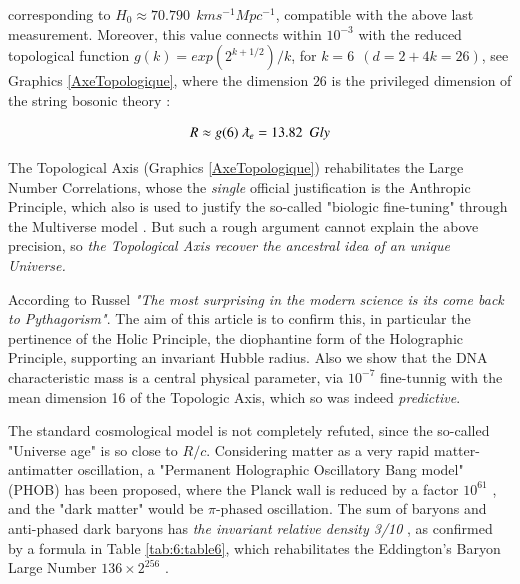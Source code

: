 \documentclass[a4paper,9pt]{article}
\begin{document}
corresponding to  $ H_0 \approx 70.790 ~~ km s^{-1} Mpc^{-1}$, compatible with the above last measurement. Moreover, this value connects within $10^{-3}$ with the reduced topological function $g(k) = exp(2^{k+1/2})/k$, for $k = 6 ~~(d = 2 +4k = 26)$, see Graphics \ref{AxeTopologique},  where the dimension $26$ is the privileged dimension of the string bosonic theory \cite{Sanchez3}:  


\begin{equation}\label{Eq2}
R \approx g(6)~\lambdabar_e  = 13.82~~Gly
 \end{equation}


The Topological Axis (Graphics \ref{AxeTopologique}) rehabilitates the Large Number Correlations, whose the \textit{single} official justification is the Anthropic Principle,  which also is used to justify the so-called "biologic fine-tuning" through the Multiverse model \cite {Rees}. But such a rough argument cannot explain the above precision, so \textit{the Topological Axis recover the ancestral idea of an unique Universe.} 


According to Russel \textit{"The most surprising in the modern science is its come back to Pythagorism"}\cite{Alcina}. The aim of this article is to confirm this, in particular the pertinence of the Holic Principle, the diophantine form of the Holographic Principle, supporting an invariant Hubble radius. Also we show that the DNA characteristic mass is a central physical parameter, via $10^{-7}$ fine-tunnig with the mean dimension 16 of the Topologic Axis, which so was indeed \textit{predictive}. 


The standard cosmological model is not completely refuted, since the so-called "Universe age" is so close to $R/c$. Considering matter as a very rapid matter-antimatter oscillation, a "Permanent Holographic Oscillatory Bang model" (PHOB) has been proposed, where the Planck wall is reduced by a factor $10^{61}$ \cite{Sanchez4}, and the "dark matter" would be $\pi$\--phased oscillation. The sum of baryons and anti-phased dark baryons has\textit{ the invariant relative density 3/10} \cite{Sanchez3}, as confirmed by a formula in Table \ref{tab:6:table6}, which rehabilitates the Eddington's Baryon Large Number $136\times 2^{256}$ \cite{Eddington}. 




%
\end{document}

